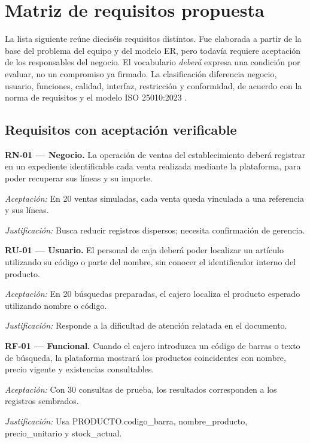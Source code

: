\section{Matriz de requisitos propuesta}
La lista siguiente reúne dieciséis requisitos distintos. Fue elaborada a partir de la base del problema del equipo y del modelo ER, pero todavía requiere aceptación de los responsables del negocio. El vocabulario \emph{deberá} expresa una condición por evaluar, no un compromiso ya firmado. La clasificación diferencia negocio, usuario, funciones, calidad, interfaz, restricción y conformidad, de acuerdo con la norma de requisitos y el modelo ISO 25010:2023 \cite{iso29148,iso25010,erPFC2026}.

\subsection{Requisitos con aceptación verificable}
\noindent\textbf{RN-01 — Negocio.} La operación de ventas del establecimiento deberá registrar en un expediente identificable cada venta realizada mediante la plataforma, para poder recuperar sus líneas y su importe.\par
\noindent\textit{Aceptación:} En 20 ventas simuladas, cada venta queda vinculada a una referencia y sus líneas.\par
\noindent\textit{Justificación:} Busca reducir registros dispersos; necesita confirmación de gerencia.\par\medskip
\noindent\textbf{RU-01 — Usuario.} El personal de caja deberá poder localizar un artículo utilizando su código o parte del nombre, sin conocer el identificador interno del producto.\par
\noindent\textit{Aceptación:} En 20 búsquedas preparadas, el cajero localiza el producto esperado utilizando nombre o código.\par
\noindent\textit{Justificación:} Responde a la dificultad de atención relatada en el documento.\par\medskip
\noindent\textbf{RF-01 — Funcional.} Cuando el cajero introduzca un código de barras o texto de búsqueda, la plataforma mostrará los productos coincidentes con nombre, precio vigente y existencias consultables.\par
\noindent\textit{Aceptación:} Con 30 consultas de prueba, los resultados corresponden a los registros sembrados.\par
\noindent\textit{Justificación:} Usa PRODUCTO.codigo\_barra, nombre\_producto, precio\_unitario y stock\_actual.\par\medskip
